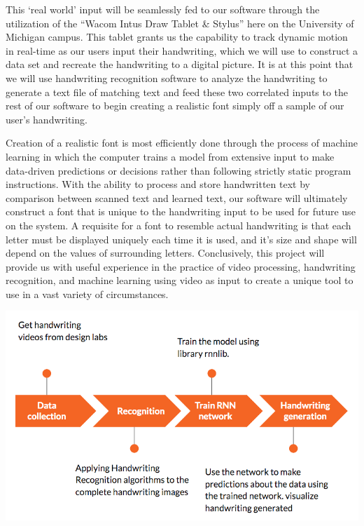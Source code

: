 \documentclass{article} %
\begin{document}
This ‘real world’ input will be seamlessly fed to our software through the utilization of the “Wacom Intus Draw Tablet \& Stylus” here on the University of Michigan campus. This tablet grants us the capability to track dynamic motion in real-time as our users input their handwriting, which we will use to construct a data set and recreate the handwriting to a digital picture. It is at this point that we will use handwriting recognition software to analyze the handwriting to generate a text file of matching text and feed these two correlated inputs to the rest of our software to begin creating a realistic font simply off a sample of our user’s handwriting. 

Creation of a realistic font is most efficiently done through the process of machine learning in which the computer trains a model from extensive input to make data-driven predictions or decisions rather than following strictly static program instructions. With the ability to process and store handwritten text by comparison between scanned text and learned text, our software will ultimately construct a font that is unique to the handwriting input to be used for future use on the system. A requisite for a font to resemble actual handwriting is that each letter must be displayed uniquely each time it is used, and it’s size and shape will depend on the values of surrounding letters. Conclusively, this project will provide us with useful experience in the practice of video processing, handwriting recognition, and machine learning using video as input to create a unique tool to use in a vast variety of circumstances.
\begin{center}
\includegraphics[scale = 0.5]{Method.png}
\end{center}
\end{document}
